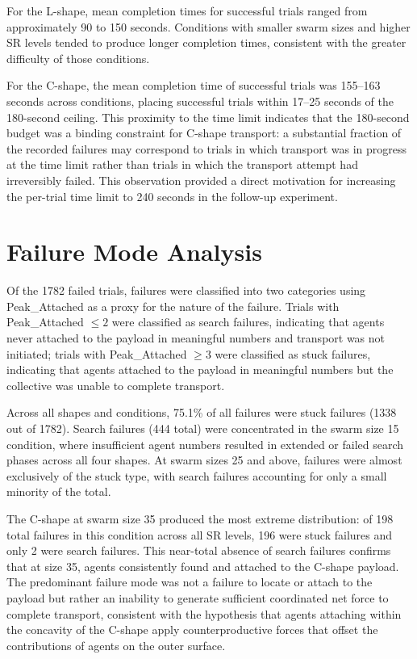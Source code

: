 For the L-shape, mean completion times for successful trials ranged from approximately 90 to 150 seconds. Conditions with smaller swarm sizes and higher SR levels tended to produce longer completion times, consistent with the greater difficulty of those conditions.

For the C-shape, the mean completion time of successful trials was 155--163 seconds across conditions, placing successful trials within 17--25 seconds of the 180-second ceiling. This proximity to the time limit indicates that the 180-second budget was a binding constraint for C-shape transport: a substantial fraction of the recorded failures may correspond to trials in which transport was in progress at the time limit rather than trials in which the transport attempt had irreversibly failed. This observation provided a direct motivation for increasing the per-trial time limit to 240 seconds in the follow-up experiment.

\section{Failure Mode Analysis}
\label{sec:results_failures}

Of the 1782 failed trials, failures were classified into two categories using Peak\_Attached as a proxy for the nature of the failure. Trials with Peak\_Attached $\leq 2$ were classified as search failures, indicating that agents never attached to the payload in meaningful numbers and transport was not initiated; trials with Peak\_Attached $\geq 3$ were classified as stuck failures, indicating that agents attached to the payload in meaningful numbers but the collective was unable to complete transport.

Across all shapes and conditions, 75.1\% of all failures were stuck failures (1338 out of 1782). Search failures (444 total) were concentrated in the swarm size 15 condition, where insufficient agent numbers resulted in extended or failed search phases across all four shapes. At swarm sizes 25 and above, failures were almost exclusively of the stuck type, with search failures accounting for only a small minority of the total.

The C-shape at swarm size 35 produced the most extreme distribution: of 198 total failures in this condition across all SR levels, 196 were stuck failures and only 2 were search failures. This near-total absence of search failures confirms that at size 35, agents consistently found and attached to the C-shape payload. The predominant failure mode was not a failure to locate or attach to the payload but rather an inability to generate sufficient coordinated net force to complete transport, consistent with the hypothesis that agents attaching within the concavity of the C-shape apply counterproductive forces that offset the contributions of agents on the outer surface.

